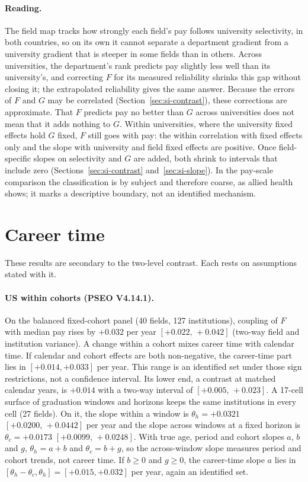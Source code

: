 \documentclass[11pt]{article}
\newcommand{\ci}[2]{$[#1,\allowbreak\,#2]$}
\begin{document}
\paragraph{Reading.} The field map tracks how strongly each field's pay follows university selectivity, in both
countries, so on its own it cannot separate a department gradient from a university gradient that is steeper in some
fields than in others. Across universities, the department's rank predicts pay slightly less well than its
university's, and correcting $F$ for its measured reliability shrinks this gap without closing it; the extrapolated
reliability gives the same answer. Because the errors of $F$ and $G$ may be correlated (Section~\ref{sec:si-contrast}),
these corrections are approximate. That $F$ predicts pay no better than $G$ across universities does not mean that it
adds nothing to $G$. Within universities, where the university fixed effects hold $G$ fixed, $F$ still goes with pay:
the within correlation with fixed effects only and the slope with university and field fixed effects are positive.
Once field-specific slopes on selectivity and $G$ are added, both shrink to intervals that include zero
(Sections~\ref{sec:si-contrast} and~\ref{sec:si-slope}). In the pay-scale comparison the classification is by
subject and therefore coarse, as allied health shows; it marks a descriptive boundary, not an identified mechanism.

\section{Career time}\label{sec:si-career}

These results are secondary to the two-level contrast. Each rests on assumptions stated with it.

\paragraph{US within cohorts (PSEO V4.14.1).} On the balanced fixed-cohort panel (40 fields, 127
institutions), coupling of $F$ with median pay rises by $+0.032$ per year \ci{+0.022}{+0.042} (two-way field and
institution variance). A change within a cohort mixes career time with calendar time. If calendar and cohort effects
are both non-negative, the career-time part lies in $[+0.014, +0.033]$ per year. This range is an identified set under
those sign restrictions, not a confidence interval. Its lower end, a contrast at matched calendar years, is $+0.014$
with a two-way interval of \ci{+0.005}{+0.023}. A 17-cell surface of graduation windows and horizons keeps the same
institutions in every cell (27 fields). On it, the slope within a window is $\theta_h=+0.0321$
\ci{+0.0200}{+0.0442} per year and the slope across windows at a fixed horizon is $\theta_c=+0.0173$
\ci{+0.0099}{+0.0248}. With true age, period and cohort slopes $a$, $b$ and $g$, $\theta_h=a+b$ and $\theta_c=b+g$, so
the across-window slope measures period and cohort trends, not career time. If $b\ge0$ and $g\ge0$, the career-time
slope $a$ lies in $[\theta_h-\theta_c,\theta_h]=[+0.015,+0.032]$ per year, again an identified set.
\end{document}
